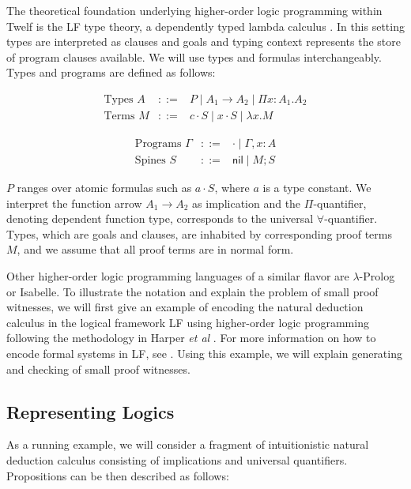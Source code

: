 \documentclass{llncs}
\newcommand{\comb}{\cdot}
\newcommand{\nil}{\mathsf{nil}}
\begin{document}
The theoretical foundation underlying higher-order logic programming
within Twelf is the LF type theory, a dependently
typed lambda calculus  \cite{Pfenning91lf}. In this setting types are interpreted as
clauses and goals and typing context represents the store of program
clauses available. We will use types and formulas
interchangeably. Types and programs are defined as follows: 

\begin{minipage}[b]{6cm}
\[
\begin{array}{lcl}
\mbox{Types } A & ::= & P \mid  A_1 \rightarrow A_2 \mid \Pi x:A_1.A_2 \\
\mbox{Terms }  M & ::= & c \comb S \mid x \comb S \mid \lambda x. M  
\end{array}
\]
\end{minipage}
\begin{minipage}[b]{6cm}
\[
\begin{array}{lcl}
\mbox{Programs }  \Gamma & ::= & \cdot \mid \Gamma, x:A \\
\mbox{Spines } S & ::= & \nil \mid M ; S
\end{array}
\]
\end{minipage}

$P$ ranges over atomic formulas such as $a \cdot S$, where $a$ is a
type constant. We interpret the function arrow $A_1 \rightarrow A_2$
as implication and the $\Pi$-quantifier, denoting dependent function
type, corresponds to the universal $\forall$-quantifier. Types, which
are goals and clauses, are inhabited by corresponding proof terms $M$,
and we assume that all proof terms are in normal form. 

Other higher-order logic programming languages of a similar flavor are
$\lambda$-Prolog \cite{Nadathur99cade} or Isabelle\cite{Paulson86}. To
illustrate the notation and explain the problem of small proof
witnesses, we will first give an example of encoding the natural
deduction calculus in the logical framework LF using higher-order
logic programming following the methodology in Harper {\sl et al}
\cite{Harper93jacm}. For more information on how to encode formal
systems in LF, see \cite{Pfenning97}.  Using this example, we will
explain generating and checking of small proof witnesses.

\subsection{Representing Logics}
As a running example, we will consider a fragment of intuitionistic natural
deduction calculus consisting of implications and universal quantifiers. Propositions can
be then described as follows:
\end{document}
